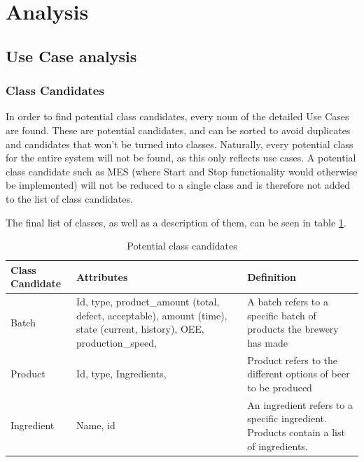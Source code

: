 \section{Analysis}

\subsection{Use Case analysis}

\subsubsection{Class Candidates}
In order to find potential class candidates, every noun of the detailed Use
Cases are found. These are potential candidates, and can be sorted to avoid
duplicates and candidates that won’t be turned into classes. Naturally, every
potential class for the entire system will not be found, as this only reflects
use cases. A potential class candidate such as MES (where Start and Stop
functionality would otherwise be implemented) will not be reduced to a single
class and is therefore not added to the list of class candidates.

The final list of classes, as well as a description of them, can be seen in
table \ref{table:class_candidates}.

\begin{table}[ht]
    \begin{tabularx}{\textwidth}{|>{\RaggedRight}p{4cm}|>{\RaggedRight}p{6cm}|>{\RaggedRight}X|}
    \hline
    \textbf{Class Candidate} & \textbf{Attributes}                                                                                                     & \textbf{Definition}                                                                    \\ \hline
    Batch                    & Id, type, product\_amount (total, defect, acceptable), amount (time), state (current, history), OEE, production\_speed, & A batch refers to a specific batch of products the brewery has made                    \\ \hline
    Product                  & Id, type, Ingredients,                                                                                                  & Product refers to the different options of beer to be produced                         \\ \hline
    Ingredient               & Name, id                                                                                                                & An ingredient refers to a specific ingredient. Products contain a list of ingredients. \\ \hline
    \end{tabularx}
    \caption{Potential class candidates}
    \label{table:class_candidates}
    \end{table}

